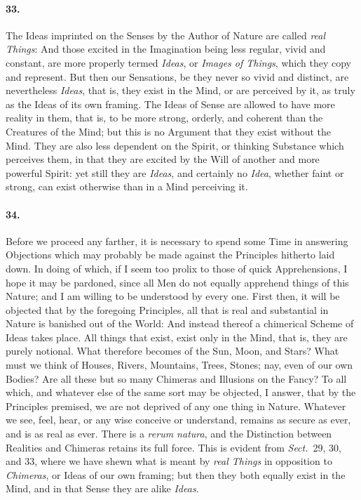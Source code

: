 \documentclass[]{article}
\newenvironment{sectionbody}{}{}
\begin{document}
\begin{sectionbody}
\paragraph{33.} The Ideas imprinted on the Senses by the Author of Nature are
called \emph{real Things}: And those excited in the Imagination
being less regular, vivid and constant, are more properly termed
\emph{Ideas}, or \emph{Images of Things}, which they copy and
represent.  But then our Sensations, be they never so vivid and
distinct, are nevertheless \emph{Ideas}, that is, they exist in
the Mind, or are perceived by it, as truly as the Ideas of its
own framing.  The Ideas of Sense are allowed to have more reality
in them, that is, to be more strong, orderly, and coherent than
the Creatures of the Mind; but this is no Argument that they
exist without the Mind.  They are also less dependent on the
Spirit, or thinking Substance which perceives them, in that they
are excited by the Will of another and more powerful Spirit: yet
still they are \emph{Ideas}, and certainly no \emph{Idea},
whether faint or strong, can exist otherwise than in a Mind
perceiving it.



\paragraph{34.} Before we proceed any farther, it is necessary to spend some Time
in answering Objections which may probably be made against the
Principles hitherto laid down.  In doing of which, if I seem too
prolix to those of quick Apprehensions, I hope it may be
pardoned, since all Men do not equally apprehend things of this
Nature; and I am willing to be understood by every one.  First
then, it will be objected that by the foregoing Principles, all
that is real and substantial in Nature is banished out of the
World: And instead thereof a chimerical Scheme of Ideas takes
place.  All things that exist, exist only in the Mind, that is,
they are purely notional.  What therefore becomes of the Sun,
Moon, and Stars?  What must we think of Houses, Rivers,
Mountains, Trees, Stones; nay, even of our own Bodies? Are all
these but so many Chimeras and Illusions on the Fancy? To all
which, and whatever else of the same sort may be objected, I
answer, that by the Principles premised, we are not deprived of
any one thing in Nature.  Whatever we see, feel, hear, or any
wise conceive or understand, remains as secure as ever, and is as
real as ever.  There is a \emph{rerum natura}, and the
Distinction between Realities and Chimeras retains its full
force.  This is evident from
\emph{Sect.}\ 29, 30, and 33,
where we have shewn what is meant by
\emph{real Things} in opposition to \emph{Chimeras}, or Ideas
of our own framing; but then they both equally exist in the Mind,
and in that Sense they are alike \emph{Ideas}.




\end{sectionbody}
\end{document}
